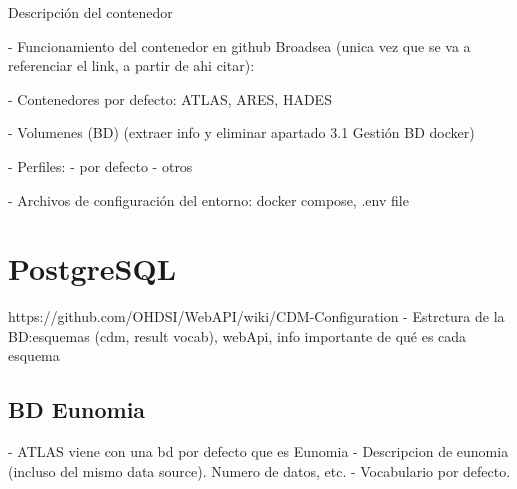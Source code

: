 Descripción del contenedor

- Funcionamiento del contenedor en github Broadsea (unica vez que se va a referenciar el link, a partir de ahi citar):

- Contenedores por defecto: ATLAS, ARES, HADES

- Volumenes (BD) (extraer info y eliminar apartado 3.1 Gestión BD docker)

- Perfiles:
        - por defecto
        - otros

- Archivos de configuración del entorno: docker compose, .env file

\section{PostgreSQL}

https://github.com/OHDSI/WebAPI/wiki/CDM-Configuration
- Estrctura de la BD:esquemas (cdm, result vocab), webApi, info importante de qué es cada esquema


\subsection{BD Eunomia}

- ATLAS viene con una bd por defecto que es Eunomia
- Descripcion de eunomia (incluso del mismo data source). Numero de datos, etc.
- Vocabulario por defecto.


